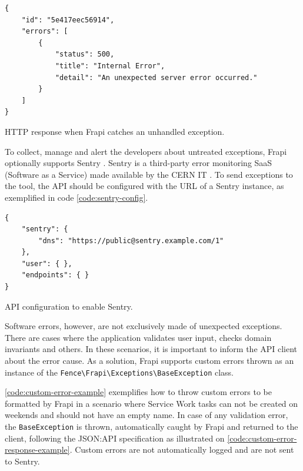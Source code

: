 \begin{listing}[htbp]
\begin{verbatim}
{
    "id": "5e417eec56914",
    "errors": [
        {
            "status": 500,
            "title": "Internal Error",
            "detail": "An unexpected server error occurred."
        }
    ]
}
\end{verbatim}
\caption{HTTP response when Frapi catches an unhandled exception.}
\label{code:error-500-body}
\end{listing}

To collect, manage and alert the developers about untreated exceptions, Frapi optionally supports Sentry \cite{sentry-about}. Sentry is a third-party error monitoring SaaS (Software as a Service) made available by the CERN IT \cite{sentry-cern}. To send exceptions to the tool, the API should be configured with the URL of a Sentry instance, as exemplified in code \autoref{code:sentry-config}.

\begin{listing}[htbp]
\begin{verbatim}
{
    "sentry": {
        "dns": "https://public@sentry.example.com/1"
    },
    "user": { },
    "endpoints": { }
}
\end{verbatim}
\caption{API configuration to enable Sentry.}
\label{code:sentry-config}
\end{listing}

Software errors, however, are not exclusively made of unexpected exceptions. There are cases where the application validates user input, checks domain invariants and others. In these scenarios, it is important to inform the API client about the error cause. As a solution, Frapi supports custom errors thrown as an instance of the \texttt{Fence\textbackslash Frapi\textbackslash Exceptions\textbackslash BaseException} class. 

\autoref{code:custom-error-example} exemplifies how to throw custom errors to be formatted by Frapi in a scenario where Service Work tasks can not be created on weekends and should not have an empty name. In case of any validation error, the \texttt{BaseException} is thrown, automatically caught by Frapi and returned to the client, following the JSON:API specification as illustrated on \autoref{code:custom-error-response-example}. Custom errors are not automatically logged and are not sent to Sentry.

